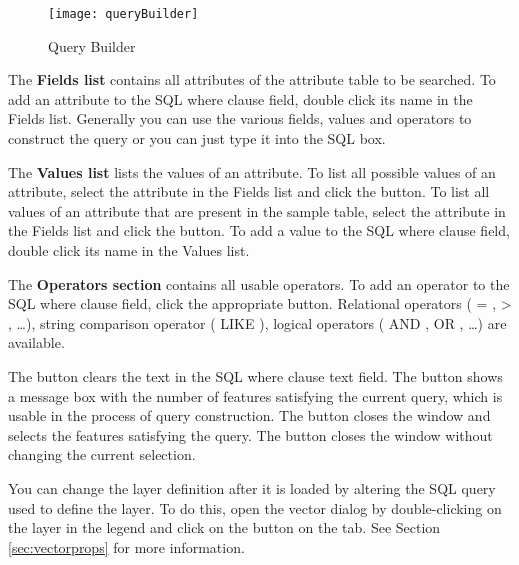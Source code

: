 \begin{figure}[ht]
  \begin{center}
    \caption{Query Builder \nixcaption}\label{fig:query_builder}\smallskip
    \texttt{[image: queryBuilder]}
  \end{center}  
\end{figure}

The \textbf{Fields list} contains all attributes of the attribute table to be 
searched. To add an attribute to the SQL where clause field, double click its 
name in the Fields list. Generally you can use the various fields, values and 
operators to construct the query or you can just type it into the SQL box. 

The \textbf{Values list} lists the values of an attribute. To list all possible 
values of an attribute, select the attribute in the Fields list and click the 
 button. To list all values 
of an attribute that are present in the sample table, select the attribute in 
the Fields list and click the  
button. To add a value to the SQL 
where clause field, double click its name in the Values list.   

The \textbf{Operators section} contains all usable operators. To add an operator 
to the SQL where clause field, click the appropriate button. Relational operators 
( = , > , \dots), string comparison operator ( LIKE ), logical operators ( AND , OR 
, \dots) are available. 

The  button clears the text in the SQL where clause text field. The 
 button shows a message box with the number of features satisfying 
the current query, which is usable in the process of query construction. The 
 button closes the window and selects the features satisfying the 
query. The  button closes the window without changing the current 
selection. 

\begin{Tip}\caption{\textsc{Changing the Layer Definition}}
You can change the layer definition after it is loaded by altering
the SQL query used to define the layer. To do this, open the 
vector  dialog by double-clicking on the layer in the legend and click on the
 button on the  tab. See Section
\ref{sec:vectorprops} for more information.
\end{Tip}

